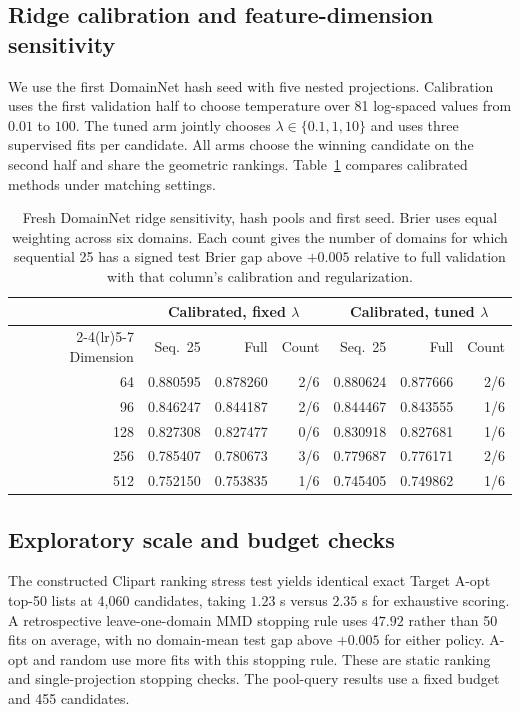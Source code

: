 \subsection{Ridge calibration and feature-dimension sensitivity}
\label{app:fresh-ridge}

We use the first DomainNet hash seed with five nested projections. Calibration uses the first validation half to choose temperature over 81 log-spaced values from $0.01$ to $100$. The tuned arm jointly chooses $\lambda\in\{0.1,1,10\}$ and uses three supervised fits per candidate. All arms choose the winning candidate on the second half and share the geometric rankings. Table~\ref{tab:fresh-ridge-sensitivity} compares calibrated methods under matching settings.

\begin{table}[htbp]
\centering
\caption{Fresh DomainNet ridge sensitivity, hash pools and first seed. Brier uses equal weighting across six domains. Each count gives the number of domains for which sequential 25 has a signed test Brier gap above $+0.005$ relative to full validation with that column's calibration and regularization.}
\label{tab:fresh-ridge-sensitivity}
\begin{tabular}{r rrr rrr}
\toprule
 & \multicolumn{3}{c}{Calibrated, fixed $\lambda$} & \multicolumn{3}{c}{Calibrated, tuned $\lambda$} \\
\cmidrule(lr){2-4}\cmidrule(lr){5-7}
Dimension & Seq.\ 25 & Full & Count & Seq.\ 25 & Full & Count \\
\midrule
64  & 0.880595 & 0.878260 & 2/6 & 0.880624 & 0.877666 & 2/6 \\
96  & 0.846247 & 0.844187 & 2/6 & 0.844467 & 0.843555 & 1/6 \\
128 & 0.827308 & 0.827477 & 0/6 & 0.830918 & 0.827681 & 1/6 \\
256 & 0.785407 & 0.780673 & 3/6 & 0.779687 & 0.776171 & 2/6 \\
512 & 0.752150 & 0.753835 & 1/6 & 0.745405 & 0.749862 & 1/6 \\
\bottomrule
\end{tabular}
\end{table}

\subsection{Exploratory scale and budget checks}
The constructed Clipart ranking stress test yields identical exact Target A-opt top-50 lists at 4,060 candidates, taking $1.23$ s versus $2.35$ s for exhaustive scoring. A retrospective leave-one-domain MMD stopping rule uses $47.92$ rather than 50 fits on average, with no domain-mean test gap above $+0.005$ for either policy. A-opt and random use more fits with this stopping rule. These are static ranking and single-projection stopping checks. The pool-query results use a fixed budget and 455 candidates.
